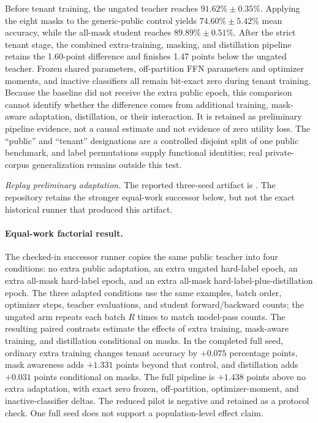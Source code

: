 \documentclass[11pt,a4paper]{article}
\begin{document}
Before tenant training, the ungated teacher reaches
$91.62\%\pm0.35\%$.  Applying the eight masks to the generic-public
control yields $74.60\%\pm5.42\%$ mean accuracy, while the all-mask
student reaches $89.89\%\pm0.51\%$.  After the strict tenant stage,
the combined extra-training, masking, and distillation pipeline retains
the 1.60-point difference and
finishes 1.47 points below the ungated teacher.  Frozen shared
parameters, off-partition FFN parameters and optimizer moments, and
inactive classifiers all remain bit-exact zero during tenant
training.  Because the baseline did not receive the extra public
epoch, this comparison cannot identify whether the difference comes
from additional training, mask-aware adaptation, distillation, or
their interaction.  It is retained as preliminary pipeline evidence,
not a causal estimate and not evidence of zero utility loss.  The
``public'' and ``tenant'' designations are a controlled disjoint split
of one public benchmark, and label permutations supply functional
identities; real private-corpus generalization remains outside this
test.

\begin{sloppypar}
\noindent\textit{Replay preliminary adaptation.} The reported
three-seed artifact is
.
The repository retains the stronger equal-work successor below, but
not the exact historical runner that produced this artifact.
\end{sloppypar}

\paragraph{Equal-work factorial result.}
The checked-in successor runner copies the same public teacher into
four conditions: no extra public adaptation, an extra ungated
hard-label epoch, an extra all-mask hard-label epoch, and an extra
all-mask hard-label-plus-distillation epoch.  The three adapted
conditions use the same examples, batch order, optimizer steps,
teacher evaluations, and student forward/backward counts; the
ungated arm repeats each batch $R$ times to match model-pass counts.
The resulting paired contrasts estimate the effects of extra
training, mask-aware training, and distillation conditional on masks.
In the completed full seed, ordinary extra training changes tenant accuracy by
$+0.075$ percentage points, mask awareness adds $+1.331$ points beyond that
control, and distillation adds $+0.031$ points conditional on masks. The full
pipeline is $+1.438$ points above no extra adaptation, with exact zero frozen,
off-partition, optimizer-moment, and inactive-classifier deltas. The reduced
pilot is negative and retained as a protocol check. One full seed does not
support a population-level effect claim.
\end{document}
